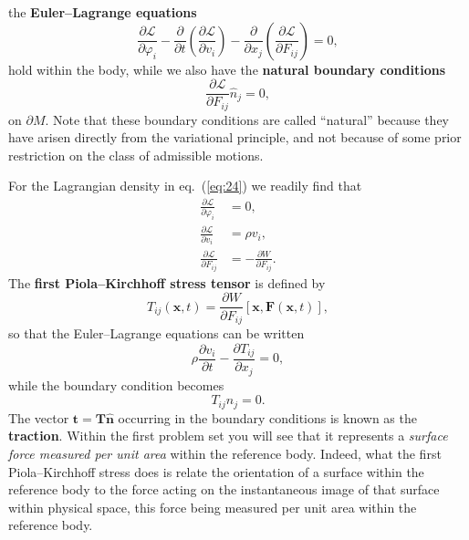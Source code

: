 the \textbf{Euler--Lagrange equations}
\begin{equation}
\frac{\partial\mathcal{L}}{\partial\varphi_{i}}-\frac{\partial}{\partial t}\left(\frac{\partial\mathcal{L}}{\partial v_{i}}\right)-\frac{\partial}{\partial x_{j}}\left(\frac{\partial\mathcal{L}}{\partial F_{ij}}\right)=0,
\label{eq:33}
\end{equation}
hold within the body, while we also have the \textbf{natural boundary conditions}
\begin{equation}
\frac{\partial\mathcal{L}}{\partial F_{ij}}\hat{n}_{j}=0,
\label{eq:34}
\end{equation}
on $\partial M$. Note that these boundary conditions are called ``natural'' because they have arisen directly from the 
variational principle, and not because of some prior restriction on the class of admissible motions.


For the Lagrangian density in eq.~(\ref{eq:24}) we readily find that
\begin{align}
\frac{\partial\mathcal{L}}{\partial\varphi_{i}}&=0, \label{eq:35a}\\
\frac{\partial\mathcal{L}}{\partial v_{i}}&=\rho v_{i}, \label{eq:35b}\\
\frac{\partial\mathcal{L}}{\partial F_{ij}}&=-\frac{\partial W}{\partial F_{ij}}. \label{eq:35c}
\end{align}
The \textbf{first Piola--Kirchhoff stress tensor} is defined by
\begin{equation}
T_{ij}(\mathbf{x},t)=\frac{\partial W}{\partial F_{ij}}[\mathbf{x},\mathbf{F}(\mathbf{x},t)],
\label{eq:36}
\end{equation}
so that the Euler--Lagrange equations can be written
\begin{equation}
\rho\frac{\partial v_{i}}{\partial t}-\frac{\partial T_{ij}}{\partial x_{j}}=0,
\label{eq:37}
\end{equation}
while the boundary condition becomes
\begin{equation}
T_{ij}\hat{n}_{j}=0.
\label{eq:38}
\end{equation}
The vector $\mathbf{t}=\mathbf{T}\hat{\mathbf{n}}$ occurring in the boundary conditions is known as the \textbf{traction}. Within the 
first problem set you will see that it represents a \emph{surface force measured per unit area} within the reference body. 
Indeed, what the first Piola--Kirchhoff stress does is relate the orientation of a surface within the reference body 
to the force acting on the instantaneous image of that surface within physical space, this force being measured 
per unit area within the reference body. 


